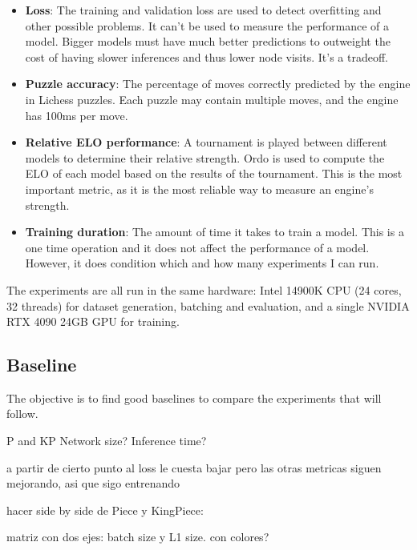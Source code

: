 \begin{itemize}
\item \textbf{Loss}: The training and validation loss are used to detect overfitting and other possible problems. It can't be used to measure the performance of a model. Bigger models must have much better predictions to outweight the cost of having slower inferences and thus lower node visits. It's a tradeoff.

\item \textbf{Puzzle accuracy}: The percentage of moves correctly predicted by the engine in Lichess puzzles. Each puzzle may contain multiple moves, and the engine has 100ms per move.

\item \textbf{Relative ELO performance}: A tournament is played between different models to determine their relative strength. Ordo is used to compute the ELO of each model based on the results of the tournament. This is the most important metric, as it is the most reliable way to measure an engine's strength.


\item \textbf{Training duration}: The amount of time it takes to train a model. This is a one time operation and it does not affect the performance of a model. However, it does condition which and how many experiments I can run.
\end{itemize}

The experiments are all run in the same hardware: Intel 14900K CPU (24 cores, 32 threads) for dataset generation, batching and evaluation, and a single NVIDIA RTX 4090 24GB GPU for training.

\subsection{Baseline}

The objective is to find good baselines to compare the experiments that will follow.

P and KP
Network size?
Inference time?

a partir de cierto punto al loss le cuesta bajar pero las otras metricas siguen mejorando, asi que sigo entrenando

hacer side by side de Piece y KingPiece:

matriz con dos ejes: batch size y L1 size. con colores?

